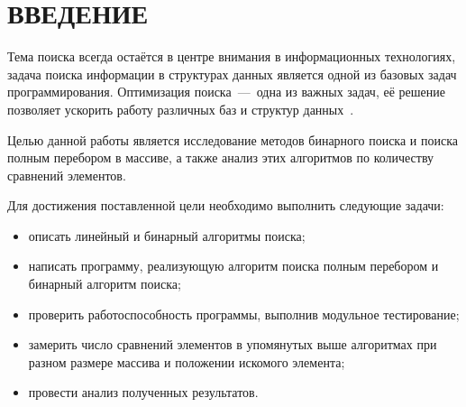 \chapter*{\hfill{\centering ВВЕДЕНИЕ}\hfill}


Тема поиска всегда остаётся в центре внимания в информационных технологиях, задача поиска информации в структурах данных является одной из базовых задач программирования. Оптимизация поиска~---~одна из важных задач, её решение позволяет ускорить работу различных баз и структур данных~\cite{book_knut}.

Целью данной работы является исследование методов бинарного поиска и поиска полным перебором в массиве, а также анализ этих алгоритмов по количеству сравнений элементов.

\label{sec:goals}
Для достижения поставленной цели необходимо выполнить следующие задачи:
\begin{itemize}[label=---]
	\item описать линейный и бинарный алгоритмы поиска;
	\item написать программу, реализующую алгоритм поиска полным перебором и бинарный алгоритм поиска;
	\item проверить работоспособность программы, выполнив модульное тестирование;
	\item замерить число сравнений элементов в упомянутых выше алгоритмах при разном размере массива и положении искомого элемента;
	\item провести анализ полученных результатов.
\end{itemize}




